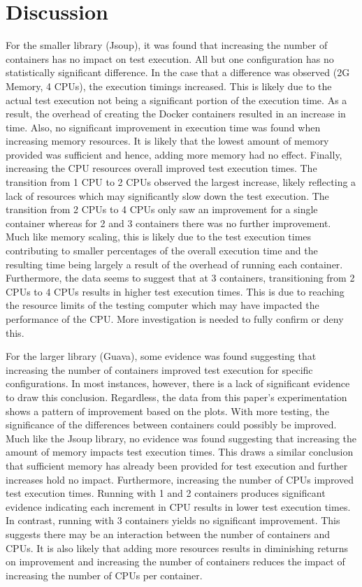 \section{Discussion}
\label{Discussion}

For the smaller library (Jsoup), it was found that increasing the number of containers has no impact on test execution. All but one configuration has no statistically significant difference. In the case that a difference was observed (2G Memory, 4 CPUs), the execution timings increased. This is likely due to the actual test execution not being a significant portion of the execution time. As a result, the overhead of creating the Docker containers resulted in an increase in time. Also, no significant improvement in execution time was found when increasing memory resources. It is likely that the lowest amount of memory provided was sufficient and hence, adding more memory had no effect. Finally, increasing the CPU resources overall improved test execution times. The transition from 1 CPU to 2 CPUs observed the largest increase, likely reflecting a lack of resources which may significantly slow down the test execution. The transition from 2 CPUs to 4 CPUs only saw an improvement for a single container whereas for 2 and 3 containers there was no further improvement. Much like memory scaling, this is likely due to the test execution times contributing to smaller percentages of the overall execution time and the resulting time being largely a result of the overhead of running each container. Furthermore, the data seems to suggest that at 3 containers, transitioning from 2 CPUs to 4 CPUs results in higher test execution times. This is due to reaching the resource limits of the testing computer which may have impacted the performance of the CPU. More investigation is needed to fully confirm or deny this. 

For the larger library (Guava), some evidence was found suggesting that increasing the number of containers improved test execution for specific configurations. In most instances, however, there is a lack of significant evidence to draw this conclusion. Regardless, the data from this paper’s experimentation shows a pattern of improvement based on the plots. With more testing, the significance of the differences between containers could possibly be improved. Much like the Jsoup library, no evidence was found suggesting that increasing the amount of memory impacts test execution times. This draws a similar conclusion that sufficient memory has already been provided for test execution and further increases hold no impact. Furthermore, increasing the number of CPUs improved test execution times. Running with 1 and 2 containers produces significant evidence indicating each increment in CPU results in lower test execution times. In contrast, running with 3 containers yields no significant improvement. This suggests there may be an interaction between the number of containers and CPUs. It is also likely that adding more resources results in diminishing returns on improvement and increasing the number of containers reduces the impact of increasing the number of CPUs per container. 



